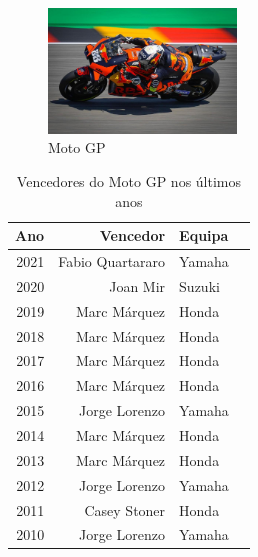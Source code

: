 \documentclass{report}
\begin{document}
\begin{figure}[h]
\center
\includegraphics[width=5cm]{motogp.jpg} %
\caption{Moto GP}
\label{figura:motogp}
\end{figure}


\begin{table}[h]
\center

\begin{tabular}{r|r |lr}

Ano & Vencedor & Equipa\\ %
\hline                               %
 2021   &  Fabio Quartararo  & Yamaha \\
 \hline
 2020 &  Joan Mir & Suzuki \\
 \hline
 2019 & Marc Márquez & Honda \\
 \hline 
 2018 & Marc Márquez & Honda \\
 \hline 
 2017 & Marc Márquez & Honda \\ 
 \hline
 2016 & Marc Márquez & Honda \\
 \hline 
 2015 & Jorge Lorenzo & Yamaha\\
 \hline
 2014 & Marc Márquez & Honda \\
 \hline
 2013 & Marc Márquez & Honda \\
 \hline
 2012 & Jorge Lorenzo & Yamaha\\
 \hline
 2011 & Casey Stoner & Honda \\
 \hline
 2010 & Jorge Lorenzo & Yamaha\\
 
 
\end{tabular}
\caption{Vencedores do Moto GP nos últimos anos}
\label{tabela}
\end{table}
\end{document}
